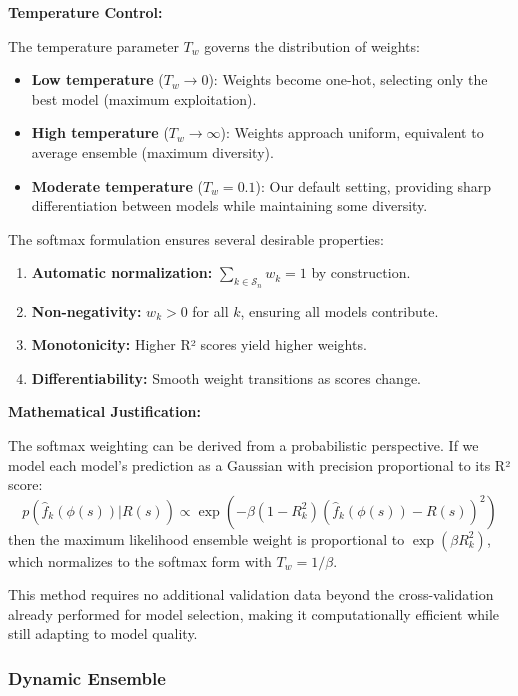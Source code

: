 \documentclass[conference]{IEEEtran}
\begin{document}
\textbf{Temperature Control:}

The temperature parameter $T_w$ governs the distribution of weights:
\begin{itemize}
    \item \textbf{Low temperature} ($T_w \to 0$): Weights become one-hot, selecting only the best model (maximum exploitation).
    \item \textbf{High temperature} ($T_w \to \infty$): Weights approach uniform, equivalent to average ensemble (maximum diversity).
    \item \textbf{Moderate temperature} ($T_w = 0.1$): Our default setting, providing sharp differentiation between models while maintaining some diversity.
\end{itemize}

The softmax formulation ensures several desirable properties:
\begin{enumerate}
    \item \textbf{Automatic normalization:} $\sum_{k \in \mathcal{S}_n} w_k = 1$ by construction.
    \item \textbf{Non-negativity:} $w_k > 0$ for all $k$, ensuring all models contribute.
    \item \textbf{Monotonicity:} Higher R² scores yield higher weights.
    \item \textbf{Differentiability:} Smooth weight transitions as scores change.
\end{enumerate}

\textbf{Mathematical Justification:}

The softmax weighting can be derived from a probabilistic perspective. If we model each model's prediction as a Gaussian with precision proportional to its R² score:
\begin{equation}
p(\hat{f}_k(\phi(s)) | R(s)) \propto \exp(-\beta(1 - R^2_k)(\hat{f}_k(\phi(s)) - R(s))^2)
\end{equation}
then the maximum likelihood ensemble weight is proportional to $\exp(\beta R^2_k)$, which normalizes to the softmax form with $T_w = 1/\beta$.

This method requires no additional validation data beyond the cross-validation already performed for model selection, making it computationally efficient while still adapting to model quality.

\subsubsection{Dynamic Ensemble}
\end{document}
